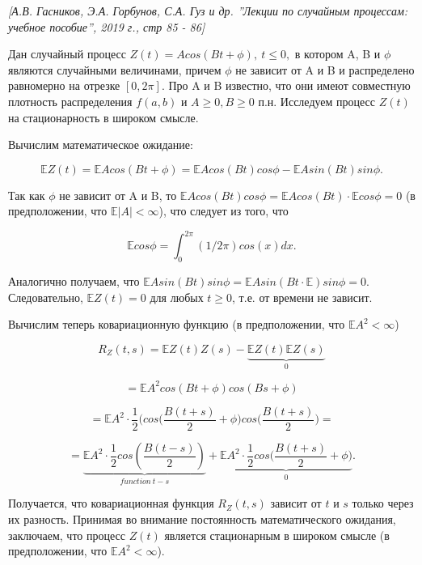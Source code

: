 \emph{[А.В. Гасников, Э.А. Горбунов, С.А. Гуз и др. ''Лекции по случайным процессам: учебное пособие'', 2019 г., стр 85 - 86]}

Дан случайный процесс $Z(t) = A cos (Bt + \phi), \  t \leq 0,$ в котором A, B и $\phi$ являются случайными величинами, причем $\phi$ не зависит от A и B и распределено равномерно на отрезке $[0, 2\pi]$. Про A и B известно, что они имеют совместную плотность распределения $f(a, b)$ и $A \geq 0, B \geq 0$ п.н. Исследуем процесс $Z(t)$ на стационарность в широком смысле.

Вычислим математическое ожидание:

$$\mathbb {E}Z(t) = \mathbb {E}A cos (Bt + \phi) = \mathbb {E}A cos (Bt) cos \phi - \mathbb {E}A sin (Bt)sin\phi.$$

Так как $\phi$ не зависит от A и B, то $\mathbb {E}A cos (Bt) cos \phi = \mathbb {E}A cos( Bt)·\mathbb {E}cos \phi= 0$
(в предположении, что $\mathbb {E}|A| < \infty$), что следует из того, что

$$\mathbb {E}cos \phi = \int_{0}^{2\pi} (1/2\pi) cos(x)dx.$$

Аналогично получаем, что $\mathbb {E}A sin( Bt)sin \phi = \mathbb {E}A sin( Bt·\mathbb {E}) sin \phi = 0.$ Следовательно, $\mathbb {E}Z(t) = 0$ для любых $t \geq 0$, т.е. от времени не зависит.

Вычислим теперь ковариационную функцию (в предположении, что $\mathbb {E}A^2 < \infty$)


$$R_Z(t, s) = \mathbb {E}Z(t)Z(s) - \underbrace{\mathbb {E}Z(t)\mathbb {E}Z(s)}_{0}$$

$$= \mathbb {E}A^2 cos (Bt + \phi)  cos(Bs + \phi)$$

$$= \mathbb {E}A^2 \cdot \frac{1}{2} \bigg( cos \bigg(\frac {B(t+s)}{2} + \phi \bigg)  cos \bigg(\frac {B(t+s)}{2} \bigg) =$$

$$= \underbrace{ \mathbb {E}A^2 \cdot \frac{1}{2} cos (\frac {B(t-s)}{2})}_{function \ t-s} + \underbrace{ \mathbb {E}A^2 \cdot \frac{1}{2}  cos \bigg(\frac {B(t+s)}{2} + \phi \bigg)}_{0}.$$


Получается, что ковариационная функция $R_{Z}(t, s)$ зависит от $t$ и $s$ только через их разность. Принимая во внимание постоянность математического ожидания, заключаем, что процесс $Z(t)$ является стационарным в широком смысле (в предположении, что $\mathbb {E}A^2 < \infty$). 

